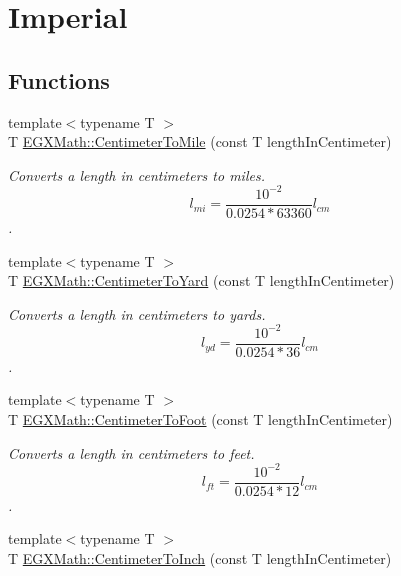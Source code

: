 \hypertarget{group___e_g_x_math-_conversions-_length_conversions-_s_i-_centimeter-_imperial}{}\section{Imperial}
\label{group___e_g_x_math-_conversions-_length_conversions-_s_i-_centimeter-_imperial}
\subsection*{Functions}
\begin{DoxyCompactItemize}
\item 
{\footnotesize template$<$typename T $>$ }\\T \mbox{\hyperlink{group___e_g_x_math-_conversions-_length_conversions-_s_i-_centimeter-_imperial_gacba2e8c1f187fae381009e4413d5d4fb}{E\+G\+X\+Math\+::\+Centimeter\+To\+Mile}} (const T length\+In\+Centimeter)
\begin{DoxyCompactList}\small\item\em Converts a length in centimeters to miles. \[ l_{mi}=\frac{10^{-2}}{0.0254 * 63360} l_{cm} \]. \end{DoxyCompactList}\item 
{\footnotesize template$<$typename T $>$ }\\T \mbox{\hyperlink{group___e_g_x_math-_conversions-_length_conversions-_s_i-_centimeter-_imperial_ga9b25beac97b6dfc0700508ca60760dfe}{E\+G\+X\+Math\+::\+Centimeter\+To\+Yard}} (const T length\+In\+Centimeter)
\begin{DoxyCompactList}\small\item\em Converts a length in centimeters to yards. \[ l_{yd}= \frac{10^{-2}}{0.0254 * 36} l_{cm} \]. \end{DoxyCompactList}\item 
{\footnotesize template$<$typename T $>$ }\\T \mbox{\hyperlink{group___e_g_x_math-_conversions-_length_conversions-_s_i-_centimeter-_imperial_ga27bbb3b1cf61bac428f40d6804e9aaec}{E\+G\+X\+Math\+::\+Centimeter\+To\+Foot}} (const T length\+In\+Centimeter)
\begin{DoxyCompactList}\small\item\em Converts a length in centimeters to feet. \[ l_{ft}= \frac{10^{-2}}{0.0254 * 12} l_{cm} \]. \end{DoxyCompactList}\item 
{\footnotesize template$<$typename T $>$ }\\T \mbox{\hyperlink{group___e_g_x_math-_conversions-_length_conversions-_s_i-_centimeter-_imperial_ga9d90fd3e24ac92c43f57db3e27a24507}{E\+G\+X\+Math\+::\+Centimeter\+To\+Inch}} (const T length\+In\+Centimeter)

\end{DoxyCompactItemize}
